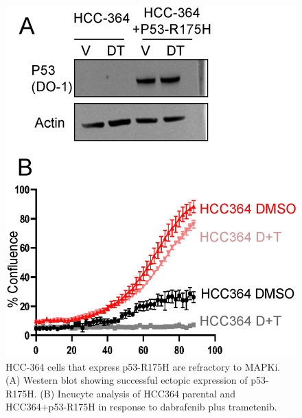 \begin{figure}
\hypertarget{fig:04}{%
\centering
\includegraphics[width=1\textwidth,height=\textheight]{images/p538.png}
\caption{HCC-364 cells that express p53-R175H are refractory to MAPKi. (A) Western blot showing successful ectopic expression of p53-R175H. (B) Incucyte analysis of HCC364 parental and HCC364+p53-R175H in response to dabrafenib plus trametenib.}\label{fig:04}
}
\end{figure}

